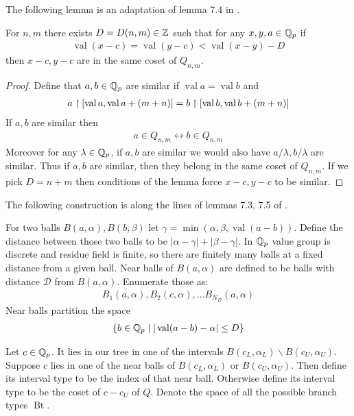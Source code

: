 \documentclass{amsart}
\newcommand{\D}{\mathcal D}
\newcommand{\curly}[1]{\left\{#1\right\}}
\DeclareMathOperator{\Bt}{Bt}
\DeclareMathOperator{\val}{val}
\begin{document}
The following lemma is an adaptation of lemma 7.4 in \cite{density}.

\begin{Lemma} \label{distance}
	For $n,m$ there exists $D = D(n,m) \in \mathbb{Z}$ such that for any $x,y,a \in \mathbb{Q}_p$ if
	\begin{align*}
		\val (x - c) = \val (y - c) < \val (x - y) - D
	\end{align*}
	then $x - c, y - c$ are in the same coset of $Q_{n,m}$.
\end{Lemma}
\begin{proof}
	Define that $a,b \in \mathbb{Q}_p$ are similar if $\val a = \val b$ and
	\begin{align*}
		a \midr [\val a, \val a + (m + n)] = b \midr [\val b, \val b + (m + n)]
	\end{align*}
	If $a,b$ are similar then
	\begin{align*}
		a \in Q_{n,m} \leftrightarrow b \in Q_{n,m}
	\end{align*}
	Moreover for any $\lambda \in \mathbb{Q}_p$, if $a,b$ are similar we would also have $a/\lambda, b/\lambda$ are similar.
	Thus if $a,b$ are similar, then they belong in the same coset of $Q_{n,m}$.
	If we pick $D = n + m$ then conditions of the lemma force $x - c, y - c$ to be similar.
\end{proof} 

The following construction is along the lines of lemmas 7.3, 7.5 of \cite{density}.

\begin{Definition}
	For two balls $B(a, \alpha), B(b, \beta)$ let $\gamma = \min(\alpha, \beta, \val(a - b))$.
	Define the distance between those two balls to be $|\alpha - \gamma| + |\beta - \gamma|$.
	In $\mathbb{Q}_p$ value group is discrete and residue field is finite, so there are finitely many balls at a fixed distance from a given ball.
	Near balls of $B(a, \alpha)$ are defined to be balls with distance $\D$ from $B(a, \alpha)$.
	Enumerate those as:
	\begin{align*}
		B_1(a, \alpha), B_2(c, \alpha), \ldots B_{N_D}(a, \alpha)
	\end{align*}
	Near balls partition the space
	\begin{align*}
		\curly{b \in \Q_p \mid |\val(a - b) - \alpha| \leq D}
	\end{align*}
\end{Definition}

\begin{Definition}
	Let $c \in \mathbb{Q}_p$.
	It lies in our tree in one of the intervals $B(c_L, \alpha_L) \backslash B(c_U, \alpha_U)$.
	Suppose $c$ lies in one of the near balls of $B(c_L, \alpha_L)$ or $B(c_U, \alpha_U)$.
	Then define its interval type to be the index of that near ball.
	Otherwise define its interval type to be the coset of $c - c_U$ of $Q$.
	Denote the space of all the possible branch types $\Bt$.
\end{Definition}
\end{document}
